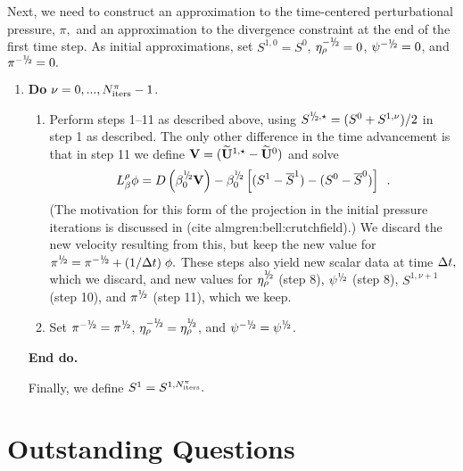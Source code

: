 Next, we need to construct an approximation to the time-centered perturbational pressure,
$\pi,$  and an approximation to the divergence constraint at the end of the
first time step.  As initial approximations, set $S^{1,0} = S^0$,
$\etarho^{-\myhalf} = 0$, $\psi^{-\myhalf} = 0$, and $\pi^{-\myhalf} = 0.$
\begin{enumerate}
  \renewcommand{\theenumi}{{\bf \alph{enumi}}}
  \renewcommand{\labelenumii}{\roman{enumii}.}
  \addtocounter{enumi}{1}
  
\item {\bf Do} {$\nu = 0,...,N_{\rm iters}^{\pi}-1$.}
  
  \begin{enumerate}
  \item Perform steps 1--11 as described above, using 
    $S^{\myhalf,\star} = (S^0 + S^{1,\nu})/2$ in step 1 as described.
    The only other difference in the time advancement is that in step 11
    we define ${\bf V} = (\widetilde{{\bf U}}^{1,\star} - \widetilde{{\bf U}}^0)$ and solve
    \begin{equation}  L_\beta^\rho \phi =
      D \left ( \beta_0^{\myhalf} {\bf V} \right) - \beta_0^{\myhalf} \left[ (S^{1}-\overline{S}^{1}) - (S^{0}-\overline{S}^{0}) \right] \enskip . 
    \end{equation}
    (The motivation for this form of the projection in the initial pressure iterations
    is discussed in (cite almgren:bell:crutchfield).)
      We discard the new velocity resulting from this, but keep the new  
      value for $\pi^{\myhalf} = \pi^{-\myhalf} + (1 / \dt) \; \phi.$  
      These steps also yield new scalar data at time $\Delta t,$ which
      we discard,  and new values for $\etarho^{\myhalf}$ (step 8), $\psi^{\myhalf}$ (step 8), 
      $S^{1,\nu+1}$ (step 10), and $\pi^{\myhalf}$ (step 11), which we keep.
    \item Set $\pi^{-\myhalf} = \pi^{\myhalf}$, $\etarho^{-\myhalf} = \etarho^{\myhalf}$,
      and $\psi^{-\myhalf} = \psi^{\myhalf}$. 
    \end{enumerate}
    
    {\bf End do.}
    
    Finally, we define $S^1 = S^{1,N_{\rm iters}^\pi}.$
    
  \end{enumerate}


\section{Outstanding Questions}

